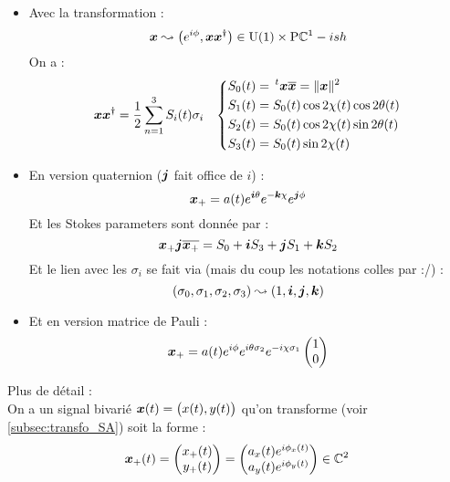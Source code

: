 \begin{itemize}
	
	\item Avec la transformation :
	\[\bf{x} \leadsto \big(e^{i\phi}, \bf{x}\bf{x}^\dagger\big)\in\U{1}\times \PC{1}-ish\]
	On a :
	\begin{align*}
		\bf{x}\bf{x}^\dagger &= \frac{1}{2}\sum_{n=1}^3 S_i(t)\sigma_i  &  \left\{\begin{aligned}
			S_0(t) &=\, ^t\bf{x}\congu{\bf{x}} = \|\bf{x}\|^2 \\
			S_1(t) &= S_0(t) \cos 2\chi(t)\cos 2\theta(t)\\
			S_2(t) &= S_0(t) \cos 2\chi(t)\sin 2\theta(t)\\
			S_3(t) &= S_0(t) \sin 2\chi(t)
		\end{aligned} \right.
	\end{align*}
	
	\item En version quaternion ($\bf{j}$ fait office de $i$) \cite{lefevre_polarization_2021} :
	\begin{equation}
		\sa{\bf{x}} = a(t)e^{\bf{i}\theta} e^{-\bf{k}\chi} e^{\bf{j}\phi}
	\end{equation}
	Et les Stokes parameters sont donnée par :
	\[\sa{\bf{x}} \bf{j} \congu{\sa{\bf{x}}} = S_0  +\bf{i}S_3 + \bf{j}S_1 + \bf{k}S_2\]
	Et le lien avec les $\sigma_i$ se fait via (mais du coup les notations colles par :/) :
	\[(\sigma_0, \sigma_1, \sigma_2, \sigma_3) \leadsto (1, \bf{i}, \bf{j}, \bf{k})\]
	
	\item Et en version matrice de Pauli :
	\begin{equation}
		\sa{\bf{x}} = a(t)e^{i\phi} e^{i\theta \sigma_2} e^{-i\chi \sigma_1} \begin{pmatrix} 1 \\ 0 \end{pmatrix}
	\end{equation}
\end{itemize}
\noindent
Plus de détail : \\ 

On a un signal bivarié $\bf{x}(t) = \big(x(t),y(t)\big)$ qu'on transforme (voir \cref{subsec:transfo_SA}) soit la forme :
\[\sa{\bf{x}}(t) = \begin{pmatrix}x_+(t) \\ y_+(t)\end{pmatrix} = \begin{pmatrix}a_x(t) e^{i\phi_x(t)} \\ a_y(t) e^{i\phi_y(t)}\end{pmatrix}\in\C^2\]
\\

